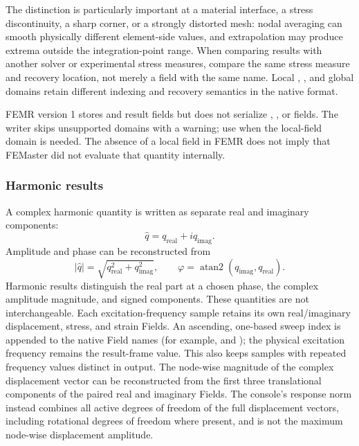 The distinction is particularly important at a material interface, a stress discontinuity, a sharp corner, or a strongly distorted mesh: nodal averaging can smooth physically different element-side values, and extrapolation may produce extrema outside the integration-point range. When comparing results with another solver or experimental stress measures, compare the same stress measure and recovery location, not merely a field with the same name. Local , , and global  domains retain different indexing and recovery semantics in the native  format.

FEMR version 1 stores  and  result fields but does not serialize , , or  fields. The writer skips unsupported domains with a warning; use  when the local-field domain is needed. The absence of a local field in FEMR does not imply that FEMaster did not evaluate that quantity internally.

\subsubsection*{Harmonic results}

A complex harmonic quantity is written as separate real and imaginary components:
\[
\hat q=q_\mathrm{real}+i q_\mathrm{imag}.
\]
Amplitude and phase can be reconstructed from
\[
|\hat q|=\sqrt{q_\mathrm{real}^2+q_\mathrm{imag}^2},
\qquad
\varphi=\operatorname{atan2}(q_\mathrm{imag},q_\mathrm{real}).
\]
Harmonic results distinguish the real part at a chosen phase, the complex amplitude magnitude, and signed components. These quantities are not interchangeable.
Each excitation-frequency sample retains its own real/imaginary displacement, stress, and strain Fields. An ascending, one-based sweep index is appended to the native Field names (for example,  and ); the physical excitation frequency remains the result-frame value. This also keeps samples with repeated frequency values distinct in  output.
The node-wise magnitude of the complex displacement vector can be reconstructed from the first three translational components of the paired real and imaginary Fields. The console's response norm instead combines all active degrees of freedom of the full displacement vectors, including rotational degrees of freedom where present, and is not the maximum node-wise displacement amplitude.


